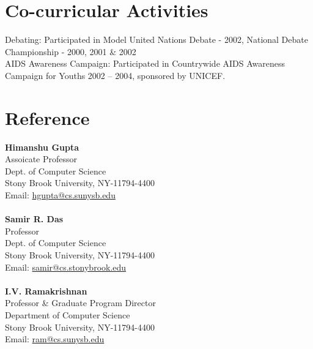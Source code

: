 \documentclass[]{friggeri-cv} %
\begin{document}
\section{Co-curricular Activities}
	\bullet{ } Debating: Participated in Model United Nations Debate - 2002, National Debate
		Championship - 2000, 2001 \& 2002 \\
	\bullet{ }AIDS Awareness Campaign: Participated in Countrywide AIDS Awareness 
		Campaign for Youths 2002 -- 2004, sponsored by UNICEF.
		\\
\section{Reference}
	  \textbf{Himanshu Gupta}\\
	  Assoicate Professor\\
	  Dept. of Computer Science\\
	  Stony Brook University, NY-11794-4400\\
	  Email: \href{hgupta@cs.sunysb.edu}{hgupta@cs.sunysb.edu} \\ \\ 
	  \textbf{Samir R. Das}\\
	  Professor\\
	  Dept. of Computer Science\\
	  Stony Brook University, NY-11794-4400\\
	  Email: \href{samir@cs.stonybrook.edu}{samir@cs.stonybrook.edu} \\ \\
	  \textbf{I.V. Ramakrishnan}\\
	  Professor \& Graduate Program Director\\
	  Department of Computer Science\\
	  Stony Brook University, NY-11794-4400 \\
	  Email: \href{mailto:ram@cs.sunysb.edu}{ram@cs.sunysb.edu}
\end{document}
